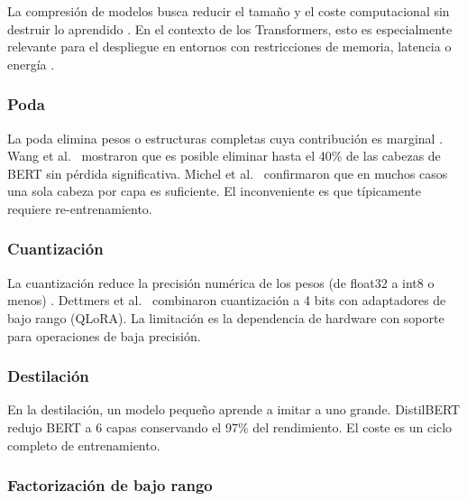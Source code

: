 La compresión de modelos busca reducir el tamaño y el coste computacional sin
destruir lo aprendido \cite{ganesh2021compressing}. En el contexto de los
Transformers, esto es especialmente relevante para el despliegue en entornos con
restricciones de memoria, latencia o energía \cite{strubell2019energy}.

\subsubsection{Poda}

La poda elimina pesos o estructuras completas cuya contribución es marginal
\cite{han2015deep}. Wang et al.\ \cite{wang2019structured} mostraron que es posible
eliminar hasta el 40\% de las cabezas de BERT sin pérdida significativa. Michel
et al.\ \cite{michel2019sixteen} confirmaron que en muchos casos una sola cabeza
por capa es suficiente. El inconveniente es que típicamente requiere re-entrenamiento.

\subsubsection{Cuantización}

La cuantización reduce la precisión numérica de los pesos (de float32 a int8 o
menos) \cite{jacob2018quantization}. Dettmers et al.\ \cite{dettmers2023qlora}
combinaron cuantización a 4 bits con adaptadores de bajo rango (QLoRA). La
limitación es la dependencia de hardware con soporte para operaciones de baja
precisión.

\subsubsection{Destilación}

En la destilación, un modelo pequeño aprende a imitar a uno grande. DistilBERT
\cite{sanh2019distilbert} redujo BERT a 6 capas conservando el 97\% del
rendimiento. El coste es un ciclo completo de entrenamiento.

\subsubsection{Factorización de bajo rango}

